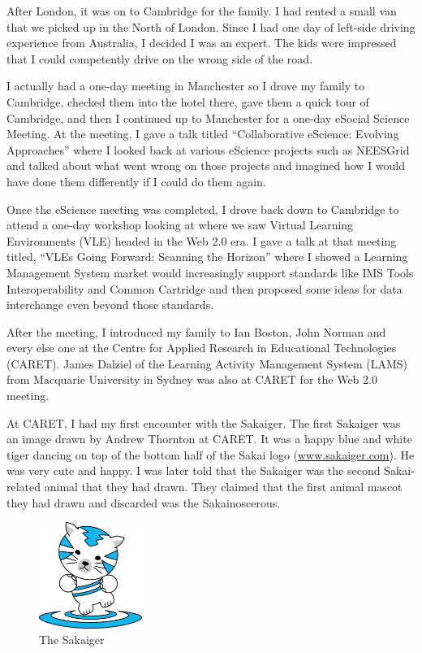 \documentclass[12pt]{book}
\begin{document}
After London, it was on to Cambridge for the family.  I had rented a small
van that we picked up in the North of London. Since I had one day of
left-side driving experience from Australia, I decided I was an expert.
The kids were impressed that I could competently drive on the wrong side of
the road.

I actually had a one-day meeting in Manchester so I drove my family
to Cambridge, checked them into the hotel there, gave them a
quick tour of Cambridge, and then I continued up to Manchester for
a one-day eSocial Science Meeting.
At the meeting, I gave a talk titled ``Collaborative eScience: Evolving Approaches''
where I looked back at various eScience projects such as
NEESGrid and talked about what went wrong on those projects and
imagined how I would have done them differently if I could do them again.

Once the eScience meeting was completed, I drove back down
to Cambridge to attend a one-day workshop
looking at where we saw Virtual Learning Environments (VLE)
headed in the Web 2.0 era.  I gave a talk at that meeting titled,
``VLEs Going Forward: Scanning the Horizon''
where I showed a Learning Management System market would increasingly
support standards like IMS Tools Interoperability and Common Cartridge
and then proposed some ideas for data interchange even beyond those
standards.

After the meeting, I introduced my family to
Ian Boston, John Norman and every else one at the Centre for Applied
Research in Educational Technologies (CARET).  James Dalziel
of the Learning Activity Management System (LAMS) from Macquarie
University in Sydney was also at CARET for the Web 2.0 meeting.


At CARET, I had my first encounter with the Sakaiger.  The
first Sakaiger was an image drawn by Andrew Thornton at CARET.
It was a happy blue and white tiger dancing on top of the
bottom half of the Sakai logo (\url{www.sakaiger.com}).
He was very cute and happy.  I was later told that
the Sakaiger was the second Sakai-related animal that they had drawn.
They claimed that the first animal mascot they had drawn and discarded
was the Sakainoscerous.  

\begin{figure}[ht!]
\centering
\includegraphics[width=0.3\textwidth]{images/Sakaiger.eps}
\caption*{The Sakaiger}
\label{overflow}
\end{figure}
\end{document}
